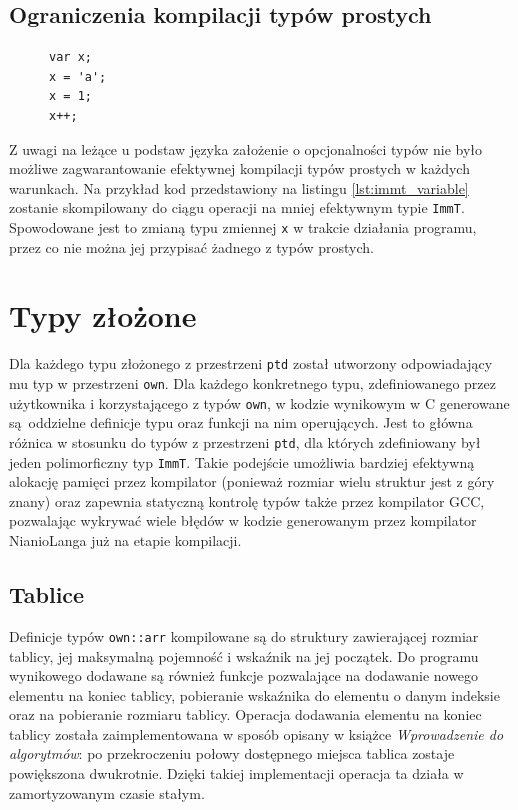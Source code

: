\documentclass[licencjacka]{pracamgr}
\begin{document}
\subsection{Ograniczenia kompilacji typów prostych}
\begin{figure}
\begin{lstlisting}[caption={Zmienna kompilowana do typu \texttt{ImmT}},label={lst:immt_variable},aboveskip=-15pt,language=nl]
var x;
x = 'a';
x = 1;
x++;
\end{lstlisting}
\end{figure}
Z uwagi na leżące u podstaw języka założenie o opcjonalności typów nie było możliwe
zagwarantowanie efektywnej kompilacji typów prostych w każdych warunkach.
Na przykład kod przedstawiony na listingu \ref{lst:immt_variable} zostanie skompilowany do ciągu operacji na mniej efektywnym typie
\texttt{ImmT}. Spowodowane jest to zmianą typu zmiennej \texttt{x} w trakcie działania programu,
przez co nie można jej przypisać żadnego z typów prostych.

\section{Typy złożone}
Dla każdego typu złożonego z przestrzeni \texttt{ptd} został utworzony odpowiadający mu typ
w przestrzeni \texttt{own}. Dla każdego konkretnego typu, zdefiniowanego przez użytkownika
i korzystającego z typów \texttt{own}, w kodzie wynikowym w C generowane są oddzielne definicje
typu oraz funkcji na nim operujących. Jest to główna różnica w stosunku do typów z przestrzeni
\texttt{ptd}, dla których zdefiniowany był jeden polimorficzny typ \texttt{ImmT}.
Takie podejście umożliwia bardziej efektywną alokację pamięci przez kompilator (ponieważ rozmiar
wielu struktur jest z góry znany) oraz zapewnia statyczną kontrolę typów także przez kompilator
GCC, pozwalając wykrywać wiele błędów w kodzie generowanym przez kompilator
NianioLanga już na etapie kompilacji.
\subsection{Tablice}
Definicje typów \texttt{own::arr} kompilowane są do struktury zawierającej rozmiar tablicy, jej
maksymalną pojemność i wskaźnik na jej początek. Do programu wynikowego
dodawane są również funkcje pozwalające na dodawanie nowego elementu na koniec tablicy, pobieranie wskaźnika do elementu
o danym indeksie oraz na pobieranie rozmiaru tablicy. Operacja dodawania elementu na koniec tablicy
została zaimplementowana w sposób opisany w książce
\textit{Wprowadzenie do algorytmów}\cite{cormen}: po przekroczeniu połowy dostępnego miejsca
tablica zostaje powiększona dwukrotnie. Dzięki takiej implementacji operacja
ta działa w zamortyzowanym czasie stałym.
\end{document}
